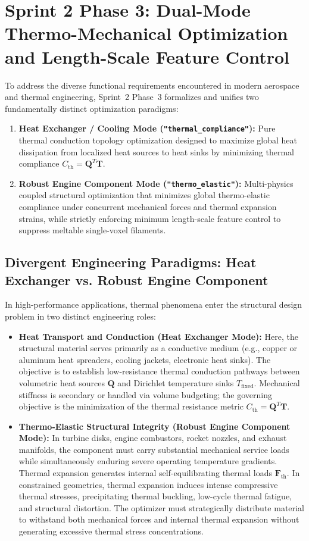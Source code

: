 \documentclass[11pt, a4paper]{article}
\begin{document}
\section{Sprint 2 Phase 3: Dual-Mode Thermo-Mechanical Optimization and Length-Scale Feature Control}
\label{sec:phase3_dualmode}

To address the diverse functional requirements encountered in modern aerospace and thermal engineering, Sprint~2 Phase~3 formalizes and unifies two fundamentally distinct optimization paradigms:
\begin{enumerate}
    \item \textbf{Heat Exchanger / Cooling Mode (\texttt{"thermal\_compliance"}):} Pure thermal conduction topology optimization designed to maximize global heat dissipation from localized heat sources to heat sinks by minimizing thermal compliance $C_{\text{th}} = \mathbf{Q}^T \mathbf{T}$.
    \item \textbf{Robust Engine Component Mode (\texttt{"thermo\_elastic"}):} Multi-physics coupled structural optimization that minimizes global thermo-elastic compliance under concurrent mechanical forces and thermal expansion strains, while strictly enforcing minimum length-scale feature control to suppress meltable single-voxel filaments.
\end{enumerate}

\subsection{Divergent Engineering Paradigms: Heat Exchanger vs. Robust Engine Component}
In high-performance applications, thermal phenomena enter the structural design problem in two distinct engineering roles:
\begin{itemize}
    \item \textbf{Heat Transport and Conduction (Heat Exchanger Mode):} Here, the structural material serves primarily as a conductive medium (e.g., copper or aluminum heat spreaders, cooling jackets, electronic heat sinks). The objective is to establish low-resistance thermal conduction pathways between volumetric heat sources $\mathbf{Q}$ and Dirichlet temperature sinks $T_{\text{fixed}}$. Mechanical stiffness is secondary or handled via volume budgeting; the governing objective is the minimization of the thermal resistance metric $C_{\text{th}} = \mathbf{Q}^T \mathbf{T}$.
    \item \textbf{Thermo-Elastic Structural Integrity (Robust Engine Component Mode):} In turbine disks, engine combustors, rocket nozzles, and exhaust manifolds, the component must carry substantial mechanical service loads while simultaneously enduring severe operating temperature gradients. Thermal expansion generates internal self-equilibrating thermal loads $\mathbf{F}_{\text{th}}$. In constrained geometries, thermal expansion induces intense compressive thermal stresses, precipitating thermal buckling, low-cycle thermal fatigue, and structural distortion. The optimizer must strategically distribute material to withstand both mechanical forces and internal thermal expansion without generating excessive thermal stress concentrations.
\end{itemize}
\end{document}
